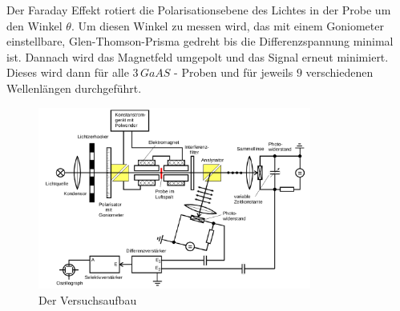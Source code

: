Der Faraday Effekt rotiert die Polarisationsebene des Lichtes in der Probe um
den Winkel $\theta$. Um diesen Winkel zu messen wird, das mit einem Goniometer
einstellbare, Glen-Thomson-Prisma gedreht bis die Differenzspannung minimal
ist. Dannach wird das Magnetfeld umgepolt und das Signal erneut minimiert.
Dieses wird dann für alle $3 \, GaAS$ - Proben und für jeweils $9$
verschiedenen Wellenlängen durchgeführt.

\begin{figure}
	\centering
	\includegraphics[width=0.8\textwidth]{./Bilder/aufbau.png}
	\caption{Der Versuchsaufbau \cite{man}}\label{fig:aufbau}
\end{figure}

\newpage